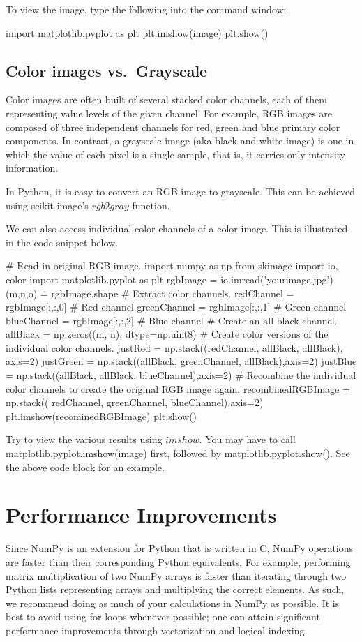 \documentclass{article}
\begin{document}
To view the image, type the following into the command window:
\begin{python}
import matplotlib.pyplot as plt
plt.imshow(image)
plt.show()
\end{python}

\subsection{Color images vs.~Grayscale}
Color images are often built of several stacked color channels, each of them representing value levels of the given channel. For example, RGB images are composed of three independent channels for red, green and blue primary color components. In contrast, a grayscale image (aka black and white image) is one in which the value of each pixel is a single sample, that is, it carries only intensity information. 

In Python, it is easy to convert an RGB image to grayscale. This can be achieved using scikit-image's \href{http://scikit-image.org/docs/stable/api/skimage.color.html#rgb2gray}{$rgb2gray$} function.

We can also access individual color channels of a color image. This is illustrated in the code snippet below.
\begin{python}
# Read in original RGB image.
import numpy as np
from skimage import io, color
import matplotlib.pyplot as plt
rgbImage = io.imread('yourimage.jpg')
(m,n,o) = rgbImage.shape
# Extract color channels.
redChannel = rgbImage[:,:,0] # Red channel
greenChannel = rgbImage[:,:,1] # Green channel
blueChannel = rgbImage[:,:,2] # Blue channel
# Create an all black channel.
allBlack = np.zeros((m, n), dtype=np.uint8)
# Create color versions of the individual color channels.
justRed = np.stack((redChannel, allBlack, allBlack), axis=2)
justGreen = np.stack((allBlack, greenChannel, allBlack),axis=2)
justBlue = np.stack((allBlack, allBlack, blueChannel),axis=2)
# Recombine the individual color channels to create the original RGB image again.
recombinedRGBImage = np.stack(( redChannel, greenChannel, blueChannel),axis=2)
plt.imshow(recominedRGBImage)
plt.show()
\end{python}

Try to view the various results using \href{https://matplotlib.org/api/_as_gen/matplotlib.pyplot.imshow.html}{$imshow$}. You may have to call matplotlib.pyplot.imshow(image) first, followed by matplotlib.pyplot.show(). See the above code block for an example.


\section{Performance Improvements}
Since NumPy is an extension for Python that is written in C, NumPy operations are faster than their corresponding Python equivalents. For example, performing matrix multiplication of two NumPy arrays is faster than iterating through two Python lists representing arrays and multiplying the correct elements. As such, we recommend doing as much of your calculations in NumPy as possible.
It is best to avoid using for loops whenever possible; one can attain significant performance improvements through vectorization and logical indexing.
\end{document}

